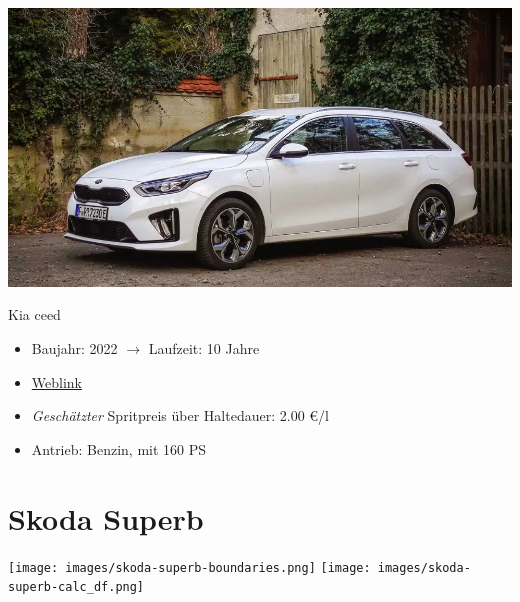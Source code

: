 \documentclass[landscape, DIV=99, 14pt]{scrartcl}
\begin{document}
\pagebreak
\null
\vspace{2cm}
\begin{center}
\includegraphics[width=0.9\columnwidth]{cars/kia-ceed-sportswagon.png}

Kia ceed
\end{center}

\begin{itemize}
    \item Baujahr: 2022 $\rightarrow$ Laufzeit: 10 Jahre
    \item \href{https://konfigurator.meinauto.de/kia/neuwagen/cee-d/angebote/cee-d-sporty-wagon/konfigurator/\#!/preisvergleich/platinum/8867329/3,7,18/private/109347-4167-291321/1321/61d21ce73c5db/cash-purchase/109348-8088-291322/48,0,10000,0,0,0,0,0,}{Weblink}
    \item \emph{Gesch\"atzter} Spritpreis \"uber Haltedauer: 2.00 \euro{}/l
    \item Antrieb: Benzin, mit 160 PS
\end{itemize}

\pagebreak


\twocolumn

\section*{Skoda Superb}
\begin{center}
\texttt{[image: images/skoda-superb-boundaries.png]}
\null
\vspace{0.5cm}
\texttt{[image: images/skoda-superb-calc\_df.png]}
\end{center}
\end{document}
